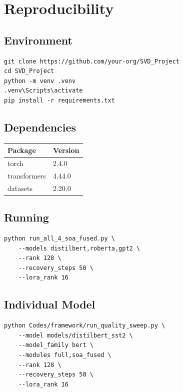 \section{Reproducibility}

\subsection{Environment}

\begin{lstlisting}
git clone https://github.com/your-org/SVD_Project
cd SVD_Project
python -m venv .venv
.venv\Scripts\activate
pip install -r requirements.txt
\end{lstlisting}

\subsection{Dependencies}

\begin{table}[H]
\centering
\small
\begin{tabular}{ll}
\toprule
\textbf{Package} & \textbf{Version} \\
\midrule
torch & 2.4.0 \\
transformers & 4.44.0 \\
datasets & 2.20.0 \\
\bottomrule
\end{tabular}
\end{table}

\subsection{Running}

\begin{lstlisting}
python run_all_4_soa_fused.py \
    --models distilbert,roberta,gpt2 \
    --rank 128 \
    --recovery_steps 50 \
    --lora_rank 16
\end{lstlisting}

\subsection{Individual Model}

\begin{lstlisting}
python Codes/framework/run_quality_sweep.py \
    --model models/distilbert_sst2 \
    --model_family bert \
    --modules full,soa_fused \
    --rank 128 \
    --recovery_steps 50 \
    --lora_rank 16
\end{lstlisting}

